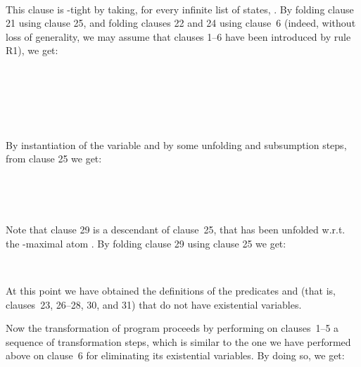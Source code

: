 \documentclass[english]{tlp}
\begin{document}
\begin{example}
\smallskip

~

\smallskip

\noindent This clause is -tight by taking, for
every infinite list  of states, . By
folding clause 21 using clause 25, and folding clauses 22 and 24 using clause~6
(indeed, without loss of generality, we may assume that clauses 1--6 have been
introduced by rule R1), we get:

\smallskip

~

~

~

\smallskip

\noindent By instantiation of the variable  and by some unfolding and
subsumption steps, from clause 25 we get:

\smallskip

~\hspace{2cm}

~

\smallskip

\noindent Note that clause 29 is a descendant of clause~25, that has
been unfolded w.r.t. the -maximal atom . By folding clause 29 using clause 25 we get:

\smallskip

~

\smallskip

\noindent At this point we have obtained the definitions of the
predicates  and  (that is,
clauses~23, 26--28, 30, and 31) that do not have existential variables.

Now the transformation of program  proceeds by
performing on clauses~1--5 a sequence of transformation steps,
which is similar to the one we have performed above on clause~6 for
eliminating its existential variables. By doing so, we get:

\smallskip
{}~

~

~




~

~


\end{example}
\end{document}
